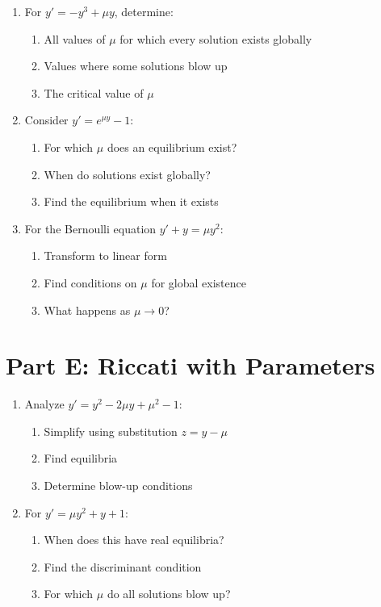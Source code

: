 \documentclass[12pt]{article}
\begin{document}
\begin{enumerate}[start=12]
    \item For $y' = -y^3 + \mu y$, determine:
    \begin{enumerate}[label=(\alph*)]
        \item All values of $\mu$ for which every solution exists globally
        \item Values where some solutions blow up
        \item The critical value of $\mu$
    \end{enumerate}
    
    \item Consider $y' = e^{\mu y} - 1$:
    \begin{enumerate}[label=(\alph*)]
        \item For which $\mu$ does an equilibrium exist?
        \item When do solutions exist globally?
        \item Find the equilibrium when it exists
    \end{enumerate}
    
    \item For the Bernoulli equation $y' + y = \mu y^2$:
    \begin{enumerate}[label=(\alph*)]
        \item Transform to linear form
        \item Find conditions on $\mu$ for global existence
        \item What happens as $\mu \to 0$?
    \end{enumerate}
\end{enumerate}

\section*{Part E: Riccati with Parameters}

\begin{enumerate}[start=15]
    \item Analyze $y' = y^2 - 2\mu y + \mu^2 - 1$:
    \begin{enumerate}[label=(\alph*)]
        \item Simplify using substitution $z = y - \mu$
        \item Find equilibria
        \item Determine blow-up conditions
    \end{enumerate}
    
    \item For $y' = \mu y^2 + y + 1$:
    \begin{enumerate}[label=(\alph*)]
        \item When does this have real equilibria?
        \item Find the discriminant condition
        \item For which $\mu$ do all solutions blow up?
    \end{enumerate}
\end{enumerate}
\end{document}

